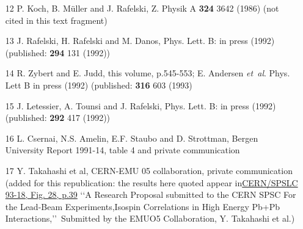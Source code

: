 \begin{mdframed}[linecolor=gray,roundcorner=12pt,backgroundcolor=Dandelion!15,linewidth=1pt,leftmargin=0cm,rightmargin=0cm,topline=true,bottomline=true,skipabove=12pt]
{\begin{itemize}
\item[12]
P. Koch, B. M\"uller and J. Rafelski, Z. Physik A \textbf{324} 3642 (1986) (not cited in this text fragment)
\item[13]
J. Rafelski, H. Rafelski and M. Danos, Phys. Lett. B: in press
(1992) (published: \textbf{294} 131 (1992))
\item[14]
R. Zybert and E. Judd, this volume, p.545-553; E. Andersen {\it et~al}. Phys. Lett B in press (1992) (published: \textbf{316} 603 (1993) 
\item[15]
J. Letessier, A. Tounsi and J. Rafelski, Phys. Lett. B: in press
(1992) (published: \textbf{292} 417 (1992))
\item[16]
L. Csernai, N.S. Amelin, E.F. Staubo and D. Strottman, Bergen University
Report 1991-14, table 4 and private communication
\item[17]
Y. Takahashi et al, CERN-EMU 05 collaboration, private communication (added for this republication: the results here quoted appear in\href{https://cds.cern.ch/record/295506/files/SC00000469.pdf}{CERN/SPSLC 93-18, Fig. 28, p.39} \lq\lq A Research Proposal submitted to the CERN SPSC For the Lead-Beam Experiments,Isospin Correlations in High Energy Pb+Pb Interactions,\rq\rq\ Submitted by the EMUO5 Collaboration, Y. Takahashi et al.)
\end{itemize}
}
\end{mdframed}
\vskip 0.5cm

